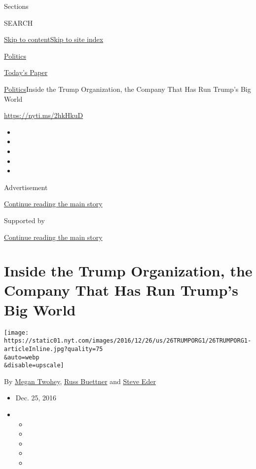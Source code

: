 Sections

SEARCH

\protect\hyperlink{site-content}{Skip to
content}\protect\hyperlink{site-index}{Skip to site index}

\href{https://www.nytimes.com/section/politics}{Politics}

\href{https://myaccount.nytimes.com/auth/login?response_type=cookie\&client_id=vi}{}

\href{https://www.nytimes.com/section/todayspaper}{Today's Paper}

\href{/section/politics}{Politics}\textbar{}Inside the Trump
Organization, the Company That Has Run Trump's Big World

\url{https://nyti.ms/2hkHkuD}

\begin{itemize}
\item
\item
\item
\item
\item
\end{itemize}

Advertisement

\protect\hyperlink{after-top}{Continue reading the main story}

Supported by

\protect\hyperlink{after-sponsor}{Continue reading the main story}

\hypertarget{inside-the-trump-organization-the-company-that-has-run-trumps-big-world}{%
\section{Inside the Trump Organization, the Company That Has Run Trump's
Big
World}\label{inside-the-trump-organization-the-company-that-has-run-trumps-big-world}}

\texttt{[image: https://static01.nyt.com/images/2016/12/26/us/26TRUMPORG1/26TRUMPORG1-articleInline.jpg?quality=75\\\&auto=webp\\\&disable=upscale]}

By \href{https://www.nytimes.com/by/megan-twohey}{Megan Twohey},
\href{http://www.nytimes.com/by/russ-buettner}{Russ Buettner} and
\href{http://www.nytimes.com/by/steve-eder}{Steve Eder}

\begin{itemize}
\item
  Dec. 25, 2016
\item
  \begin{itemize}
  \item
  \item
  \item
  \item
  \item
  \end{itemize}
\end{itemize}

